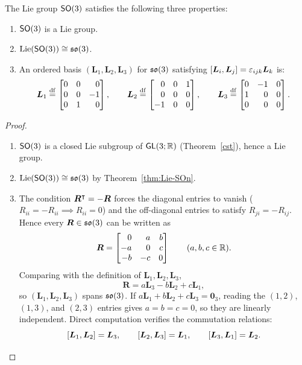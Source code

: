 \documentclass[11pt,reqno]{amsart}
\DeclareMathOperator{\Lie}{Lie}
\begin{document}
\begin{Thm}\label{thm:SO3-properties}
The Lie group $\operatorname{\mathsf{SO}}(3)$ satisfies the following three properties:
\begin{enumerate}
\item $\operatorname{\mathsf{SO}}(3)$ is a Lie group.
\item $\Lie\Br{\SO(3)}\cong\so(3)$.
\item An ordered basis $(\bm L_1,\bm L_2,\bm L_3)$ for $\mathfrak{so}(3)$ satisfying
$\SqBr{\bm L_i,\bm L_j}=\eps_{ijk}\bm L_k$ is:
\[
\bm L_1\df\mqty{0&0&0\\ 0&0&-1\\ 0&1&0},\qquad
\bm L_2\df\mqty{0&0&1\\ 0&0&0\\ -1&0&0},\qquad
\bm L_3\df\mqty{0&-1&0\\ 1&0&0\\ 0&0&0}.
\]
\end{enumerate}
\end{Thm}
\begin{proof}
\begin{enumerate}
\item $\operatorname{\mathsf{SO}}(3)$ is a closed Lie subgroup of $\operatorname{\mathsf{GL}}(3;\mathbb{R})$
(Theorem~\ref{cst}), hence a Lie group.

\item $\Lie\Br{\SO(3)}\cong\so(3)$ by Theorem~\ref{thm:Lie-SOn}.


\item The condition $\bm R^{\intercal}=-\bm R$ forces the diagonal entries to vanish
($R_{ii}=-R_{ii}\implies R_{ii}=0$) and the off-diagonal entries to satisfy
$R_{ji}=-R_{ij}$.  Hence every $\bm R\in\mathfrak{so}(3)$ can be written as
\[
\bm R=\mqty{0&a&b\\ -a&0&c\\ -b&-c&0}
\qquad(a,b,c\in\R).
\]
Comparing with the definition of $\bm L_1,\bm L_2,\bm L_3$,
\[
\bm R=a\bm L_3-b\bm L_2+c\bm L_1,
\]
so $(\bm L_1,\bm L_2,\bm L_3)$ spans $\mathfrak{so}(3)$.
If $a\bm L_1+b\bm L_2+c\bm L_3=\bm0_3$, reading the $(1,2)$,
$(1,3)$, and $(2,3)$ entries gives $a=b=c=0$, so they are linearly independent.
Direct computation verifies the commutation relations:
\[
\SqBr{\bm L_1,\bm L_2}=\bm L_3,\qquad
\SqBr{\bm L_2,\bm L_3}=\bm L_1,\qquad
\SqBr{\bm L_3,\bm L_1}=\bm L_2.
\]
\end{enumerate}

\end{proof}
\end{document}
